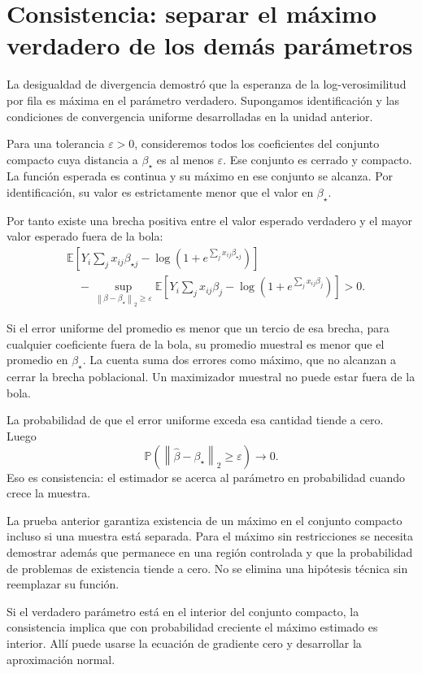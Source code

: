 \documentclass[11pt,a4paper]{article}
\newcommand{\E}{\mathbb E}
\newcommand{\Prob}{\mathbb P}
\newcommand{\norm}[1]{\left\lVert #1\right\rVert}
\begin{document}
\clearpage
\section{Consistencia: separar el máximo verdadero de los demás parámetros}\label{logit53}
La desigualdad de divergencia demostró que la esperanza de la
log-verosimilitud por fila es máxima en el parámetro verdadero.
Supongamos identificación y las condiciones de convergencia
uniforme desarrolladas en la unidad anterior.

Para una tolerancia $\varepsilon>0$, consideremos todos los
coeficientes del conjunto compacto cuya distancia a $\beta_\star$
es al menos $\varepsilon$.
Ese conjunto es cerrado y compacto.
La función esperada es continua y su máximo en ese conjunto se
alcanza. Por identificación, su valor es estrictamente menor
que el valor en $\beta_\star$.

Por tanto existe una brecha positiva entre el valor esperado
verdadero y el mayor valor esperado fuera de la bola:
\[
\begin{aligned}
&\E\!\left[Y_i\sum_jx_{ij}\beta_{\star j}
-\log(1+e^{\sum_jx_{ij}\beta_{\star j}})\right]\\
&\quad-\sup_{\norm{\beta-\beta_\star}_2\ge\varepsilon}
\E\!\left[Y_i\sum_jx_{ij}\beta_j
-\log(1+e^{\sum_jx_{ij}\beta_j})\right]>0.
\end{aligned}
\]

Si el error uniforme del promedio es menor que un tercio de esa
brecha, para cualquier coeficiente fuera de la bola,
su promedio muestral es menor que el promedio en $\beta_\star$.
La cuenta suma dos errores como máximo, que no alcanzan
a cerrar la brecha poblacional.
Un maximizador muestral no puede estar fuera de la bola.

La probabilidad de que el error uniforme exceda esa cantidad
tiende a cero. Luego
\[
\Prob(\norm{\widehat\beta-\beta_\star}_2\ge\varepsilon)\longrightarrow0.
\]
Eso es consistencia: el estimador se acerca al parámetro en
probabilidad cuando crece la muestra.

\begin{cuidado}
La prueba anterior garantiza existencia de un máximo en el
conjunto compacto incluso si una muestra está separada.
Para el máximo sin restricciones se necesita demostrar además
que permanece en una región controlada y que la probabilidad
de problemas de existencia tiende a cero.
No se elimina una hipótesis técnica sin reemplazar su función.
\end{cuidado}
Si el verdadero parámetro está en el interior del conjunto
compacto, la consistencia implica que con probabilidad creciente
el máximo estimado es interior.
Allí puede usarse la ecuación de gradiente cero y desarrollar
la aproximación normal.
\end{document}
